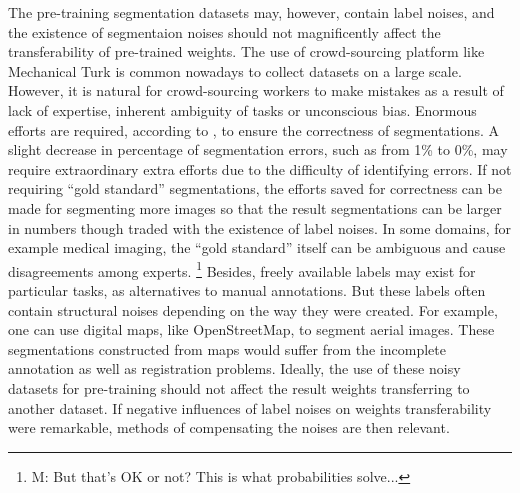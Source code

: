 

The pre-training segmentation datasets may, however, contain label noises, and the existence of segmentaion noises should not magnificently affect the transferability of pre-trained weights.
The use of crowd-sourcing platform like Mechanical Turk is common nowadays to collect datasets on a large scale.
However, it is natural for crowd-sourcing workers to make mistakes as a result of lack of expertise, inherent ambiguity of tasks or unconscious bias.
Enormous efforts are required, according to \cite{lin2014microsoft,everingham2015pascal}, to ensure the correctness of segmentations.
A slight decrease in percentage of segmentation errors, such as from 1\% to 0\%, may require extraordinary extra efforts due to the difficulty of identifying errors.
If not requiring ``gold standard'' segmentations, the efforts saved for correctness can be made for segmenting more images so that the result segmentations can be larger in numbers though traded with the existence of label noises.
In some domains, for example medical imaging, the ``gold standard'' itself can be ambiguous and cause disagreements among experts.
\footnote{M: But that's OK or not?  This is what probabilities solve...}
Besides, freely available labels may exist for particular tasks, as alternatives to manual annotations.
But these labels often contain structural noises depending on the way they were created.
For example, one can use digital maps, like OpenStreetMap, to segment aerial images.
These segmentations constructed from maps would suffer from the incomplete annotation as well as registration problems.\cite{mnih2012learning}
Ideally, the use of these noisy datasets for pre-training should not affect the result weights transferring to another dataset.
If negative influences of label noises on weights transferability were remarkable, methods of compensating the noises are then relevant.


